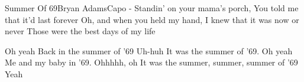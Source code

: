 \begin{song}{Summer Of 69}{Bryan Adams}{Capo -}
    Standin' on your mama's porch, You told me that it'd last forever
    Oh, and when you held my hand, I knew that it was now or never
    Those were the best days of my life

         Oh yeah        Back in the summer of '69     Uh-huh
It was the summer of '69.    Oh yeah
Me and my baby in '69.       Ohhhhh, oh
         It was the summer, summer, summer of '69
Yeah









\end{song}
